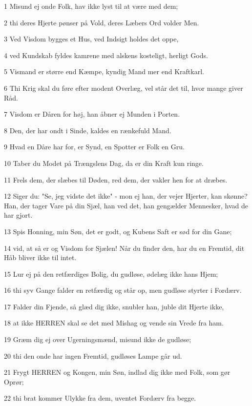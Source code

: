 \par 1 Misund ej onde Folk, hav ikke lyst til at være med dem;
\par 2 thi deres Hjerte pønser på Vold, deres Læbers Ord volder Men.
\par 3 Ved Visdom bygges et Hus, ved Indsigt holdes det oppe,
\par 4 ved Kundskab fyldes kamrene med alskens kosteligt, herligt Gods.
\par 5 Vismand er større end Kæmpe, kyndig Mand mer end Kraftkarl.
\par 6 Thi Krig skal du føre efter modent Overlæg, vel står det til, hvor mange giver Råd.
\par 7 Visdom er Dåren for høj, han åbner ej Munden i Porten.
\par 8 Den, der har ondt i Sinde, kaldes en rænkefuld Mand.
\par 9 Hvad en Dåre har for, er Synd, en Spotter er Folk en Gru.
\par 10 Taber du Modet på Trængslens Dag, da er din Kraft kun ringe.
\par 11 Frels dem, der slæbes til Døden, red dem, der vakler hen for at dræbes.
\par 12 Siger du: "Se, jeg vidste det ikke" - mon ej han, der vejer Hjerter, kan skønne? Han, der tager Vare på din Sjæl, han ved det, han gengælder Mennesker, hvad de har gjort.
\par 13 Spis Honning, min Søn, det er godt, og Kubens Saft er sød for din Gane;
\par 14 vid, at så er og Visdom for Sjælen! Når du finder den, har du en Fremtid, dit Håb bliver ikke til intet.
\par 15 Lur ej på den retfærdiges Bolig, du gudløse, ødelæg ikke hans Hjem;
\par 16 thi syv Gange falder en retfærdig og står op, men gudløse styrter i Fordærv.
\par 17 Falder din Fjende, så glæd dig ikke, snubler han, juble dit Hjerte ikke,
\par 18 at ikke HERREN skal se det med Mishag og vende sin Vrede fra ham.
\par 19 Græm dig ej over Ugerningsmænd, misund ikke de gudløse;
\par 20 thi den onde har ingen Fremtid, gudløses Lampe går ud.
\par 21 Frygt HERREN og Kongen, min Søn, indlad dig ikke med Folk, som gør Oprør;
\par 22 thi brat kommer Ulykke fra dem, uventet Fordærv fra begge.

